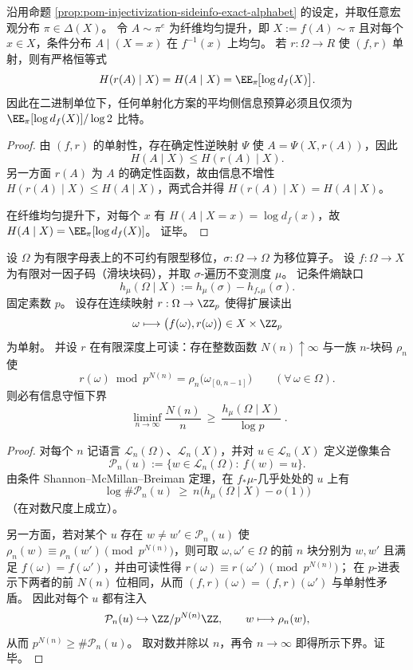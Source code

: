 \begin{proposition}[单射化的平均侧信息熵预算无松弛]\label{prop:pom-injectivization-sideinfo-exact-entropy}
沿用命题 \ref{prop:pom-injectivization-sideinfo-exact-alphabet} 的设定，并取任意宏观分布 \(\pi\in\Delta(X)\)。
令 \(A\sim \pi^{e}\) 为纤维均匀提升，即 \(X:=f(A)\sim\pi\) 且对每个 \(x\in X\)，条件分布 \(A\mid(X=x)\) 在 \(f^{-1}(x)\) 上均匀。
若 \(r:\Omega\to R\) 使 \((f,r)\) 单射，则有严格恒等式
\[
H(r(A)\mid X)=H(A\mid X)=\EE_{\pi}\!\bigl[\log d_f(X)\bigr].
\]
因此在二进制单位下，任何单射化方案的平均侧信息预算必须且仅须为 \(\EE_{\pi}[\log d_f(X)]/\log 2\) 比特。
\end{proposition}

\begin{proof}
由 \((f,r)\) 的单射性，存在确定性逆映射 \(\Psi\) 使 \(A=\Psi(X,r(A))\)，因此
\[
H(A\mid X)\le H(r(A)\mid X).
\]
另一方面 \(r(A)\) 为 \(A\) 的确定性函数，故由信息不增性 \(H(r(A)\mid X)\le H(A\mid X)\)，两式合并得 \(H(r(A)\mid X)=H(A\mid X)\)。
\par
在纤维均匀提升下，对每个 \(x\) 有 \(H(A\mid X=x)=\log d_f(x)\)，故
\(
H(A\mid X)=\EE_{\pi}[\log d_f(X)]
\)。
证毕。
\end{proof}

\begin{theorem}\label{thm:pom-prime-register-conditional-entropy-rate-lowerbound}
设 \(\Omega\) 为有限字母表上的不可约有限型移位，\(\sigma:\Omega\to\Omega\) 为移位算子。
设 \(f:\Omega\to X\) 为有限对一因子码（滑块块码），并取 \(\sigma\)-遍历不变测度 \(\mu\)。
记条件熵缺口
\[
h_\mu(\Omega\mid X):=h_\mu(\sigma)-h_{f_*\mu}(\sigma).
\]
固定素数 \(p\)。
设存在连续映射 \(r:\Omega\to\ZZ_p\) 使得扩展读出
\[
\omega\longmapsto\bigl(f(\omega),r(\omega)\bigr)\in X\times\ZZ_p
\]
为单射。
并设 \(r\) 在有限深度上可读：存在整数函数 \(N(n)\uparrow\infty\) 与一族 \(n\)-块码 \(\rho_n\) 使
\[
r(\omega)\bmod p^{N(n)}=\rho_n\!\bigl(\omega_{[0,n-1]}\bigr)\qquad(\forall\,\omega\in\Omega).
\]
则必有信息守恒下界
\[
\boxed{\;
\liminf_{n\to\infty}\frac{N(n)}{n}\ \ge\ \frac{h_\mu(\Omega\mid X)}{\log p}\; }.
\]
\end{theorem}
\begin{proof}
对每个 \(n\) 记语言 \(\mathcal L_n(\Omega)\)、\(\mathcal L_n(X)\)，并对 \(u\in\mathcal L_n(X)\) 定义逆像集合
\[
\mathcal P_n(u):=\{w\in\mathcal L_n(\Omega):\ f(w)=u\}.
\]
由条件 Shannon--McMillan--Breiman 定理，在 \(f_*\mu\)-几乎处处的 \(u\) 上有
\[
\log\#\mathcal P_n(u)\ \ge\ n\bigl(h_\mu(\Omega\mid X)-o(1)\bigr)
\]
（在对数尺度上成立）。
\par
另一方面，若对某个 \(u\) 存在 \(w\neq w'\in\mathcal P_n(u)\) 使 \(\rho_n(w)\equiv\rho_n(w')\pmod{p^{N(n)}}\)，则可取 \(\omega,\omega'\in\Omega\) 的前 \(n\) 块分别为 \(w,w'\) 且满足 \(f(\omega)=f(\omega')\)，并由可读性得 \(r(\omega)\equiv r(\omega')\pmod{p^{N(n)}}\)；
在 \(p\)-进表示下两者的前 \(N(n)\) 位相同，从而 \((f,r)(\omega)=(f,r)(\omega')\) 与单射性矛盾。
因此对每个 \(u\) 都有注入
\[
\mathcal P_n(u)\hookrightarrow \ZZ/p^{N(n)}\ZZ,
\qquad
w\longmapsto \rho_n(w),
\]
从而 \(p^{N(n)}\ge \#\mathcal P_n(u)\)。
取对数并除以 \(n\)，再令 \(n\to\infty\) 即得所示下界。证毕。
\end{proof}

